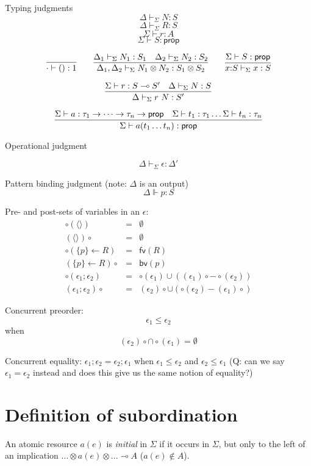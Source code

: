 \documentclass{article}
\newcommand{\lolli}{\multimap}
\newcommand{\tensor}{\otimes}
\newcommand{\one}{\mathrm{1}}
\newcommand{\prop}{\mathsf{prop}}
\newcommand{\eps}{\epsilon}
\newcommand{\nileps}{\langle\rangle}
\newcommand{\preset}[1]{\circ{(#1)}}
\newcommand{\postset}[1]{(#1){\circ}}
\newcommand{\fv}[1]{\mathsf{fv}(#1)}
\newcommand{\bv}[1]{\mathsf{bv}(#1)}
\newcommand{\union}{\cup}
\newcommand{\intersect}{\cap}
\begin{document}
Typing judgments
\[
\Delta \vdash_{\Sigma} N : S
\]
\[
\Delta \vdash_{\Sigma} R : S
\]
\[
\Sigma \vdash r : A
\]
\[
\Sigma \vdash S : \prop
\]

\[
\infer
{ \cdot \vdash () : \one }
{}
\qquad
\infer
{ \Delta_1, \Delta_2 \vdash_{\Sigma} N_1\tensor N_2 : S_1 \tensor S_2 }
{ \Delta_1 \vdash_{\Sigma} N_1 : S_1
  &
  \Delta_2 \vdash_{\Sigma} N_2 : S_2
}
\qquad
\infer
{ x{:}S \vdash_{\Sigma} x : S }
{ \Sigma \vdash S : \prop}
\]

\[
\infer
{ \Delta \vdash_{\Sigma} r\ N : S' }
{ \Sigma \vdash r : S \lolli S' 
  &
  \Delta \vdash_{\Sigma} N : S
}
\]

\[
\infer
{ \Sigma \vdash a(t_1\dots t_n) : \prop }
{ \Sigma \vdash a : \tau_1 \to \dots \to \tau_n \to \prop 
  &
  \Sigma \vdash t_1 : \tau_1
  \dots
  \Sigma \vdash t_n : \tau_n
}
\]

Operational judgment

\[
\Delta \vdash_{\Sigma} \eps : \Delta'
\]

Pattern binding judgment
(note: $\Delta$ is an output)
\[
\Delta \Vdash p : S
\]


Pre- and post-sets of variables in an $\eps$:
\begin{eqnarray*}
\preset{\nileps} &=& \emptyset\\
\postset{\nileps} &=& \emptyset\\
\preset{\{p\}\gets R} &=& \fv{R}\\
\postset{\{p\}\gets R} &=& \bv{p}\\
\preset{\eps_1;\eps_2} &=& 
  \preset{\eps_1} \union (\postset{\eps_1} - \preset{\eps_2})\\
\postset{\eps_1;\eps_2} &=& 
  \postset{\eps_2} \union (\preset{\eps_2} - \postset{\eps_1})
\end{eqnarray*}

Concurrent preorder:
\[
\eps_1 \leq \eps_2
\]
when
\[
\postset{\eps_2} \intersect \preset{\eps_1} = \emptyset
\]

Concurrent equality:
$\eps_1;\eps_2 = \eps_2;\eps_1$ when $\eps_1\leq \eps_2$ and $\eps_2 \leq
\eps_1$ (Q: can we say $\eps_1 = \eps_2$ instead and does this give us
the same notion of equality?)

\section{Definition of subordination}

An atomic resource $a(e)$ is {\em initial} in $\Sigma$ if it occurs in
$\Sigma$, but only to the left of an implication 
$... \tensor a(e) \tensor ... \lolli {A}$ ($a(e) \notin A$).
\end{document}
